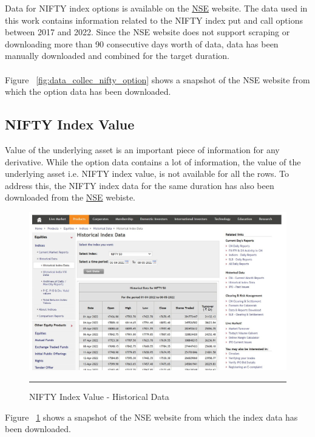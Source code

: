 Data for NIFTY index options is available on the \href{https://www1.nseindia.com/products/content/derivatives/equities/historical_fo.htm}{NSE} website. The data used in this work contains information related to the NIFTY index put and call options between 2017 and 2022. Since the NSE website does not support scraping or downloading more than 90 consecutive days worth of data, data has been manually downloaded and combined for the target duration.
\\
\\

Figure ~\ref{fig:data_collec_nifty_option} shows a snapshot of the NSE website from which the option data has been downloaded.

\subsection{NIFTY Index Value}

Value of the underlying asset is an important piece of information for any derivative. While the option data contains a lot of information, the value of the underlying asset i.e. NIFTY index value, is not available for all the rows. To address this, the NIFTY index data for the same duration has also been downloaded from the \href{https://www1.nseindia.com/products/content/equities/indices/historical_index_data.htm}{NSE} webiste.

\begin{figure}[htbp]
  \centering
    \includegraphics[scale=0.35]{Figures/data_collec_nifty_index.JPG}
    \rule{35em}{0.5pt}
  \caption[NIFTY Index Value]{NIFTY Index Value - Historical Data}
  \label{fig:data_collec_nifty_index}
\end{figure}

Figure ~\ref{fig:data_collec_nifty_index} shows a snapshot of the NSE website from which the index data has been downloaded.

